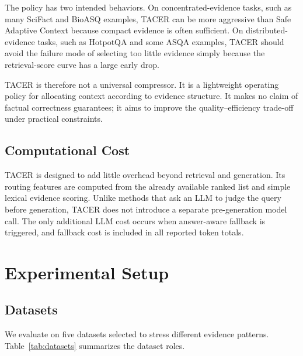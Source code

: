 \documentclass[11pt]{article}
\begin{document}
The policy has two intended behaviors. On concentrated-evidence tasks, such as many SciFact and BioASQ examples, TACER can be more aggressive than Safe Adaptive Context because compact evidence is often sufficient. On distributed-evidence tasks, such as HotpotQA and some ASQA examples, TACER should avoid the failure mode of selecting too little evidence simply because the retrieval-score curve has a large early drop.

TACER is therefore not a universal compressor. It is a lightweight operating policy for allocating context according to evidence structure. It makes no claim of factual correctness guarantees; it aims to improve the quality--efficiency trade-off under practical constraints.

\subsection{Computational Cost}

TACER is designed to add little overhead beyond retrieval and generation. Its routing features are computed from the already available ranked list and simple lexical evidence scoring. Unlike methods that ask an LLM to judge the query before generation, TACER does not introduce a separate pre-generation model call. The only additional LLM cost occurs when answer-aware fallback is triggered, and fallback cost is included in all reported token totals.

\section{Experimental Setup}

\subsection{Datasets}

We evaluate on five datasets selected to stress different evidence patterns. Table~\ref{tab:datasets} summarizes the dataset roles.

\begin{table}[t]
\centering
\small
\caption{Datasets used in the expanded evaluation.}
\label{tab:datasets}
\end{table}
\end{document}
